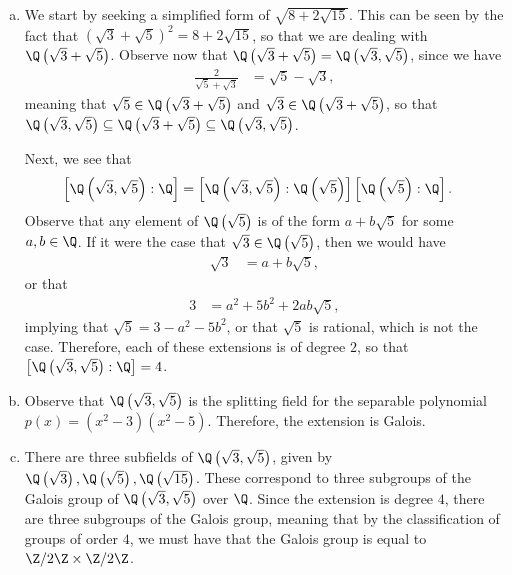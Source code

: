 \documentclass[10pt]{mypackage}
\begin{document}
\begin{solution}\hfill
  \begin{enumerate}[(a)]
    \item We start by seeking a simplified form of $\sqrt{8 + 2\sqrt{15}}$. This can be seen by the fact that $\left( \sqrt{3} + \sqrt{5} \right)^2 = 8 + 2\sqrt{15}$, so that we are dealing with $\Q\left( \sqrt{3} + \sqrt{5} \right)$. Observe now that $\Q\left( \sqrt{3} + \sqrt{5} \right) = \Q\left( \sqrt{3},\sqrt{5} \right)$, since we have
      \begin{align*}
        \frac{2}{\sqrt{5} + \sqrt{3}} &= \sqrt{5} - \sqrt{3},
      \end{align*}
      meaning that $\sqrt{5}\in \Q\left( \sqrt{3} + \sqrt{5}  \right)$ and $\sqrt{3}\in \Q\left( \sqrt{3} + \sqrt{5} \right)$, so that $\Q\left( \sqrt{3},\sqrt{5} \right)\subseteq \Q\left( \sqrt{3} + \sqrt{5} \right)\subseteq \Q\left( \sqrt{3},\sqrt{5} \right)$.

      Next, we see that
      \begin{align*}
        \left[ \Q\left( \sqrt{3},\sqrt{5} \right):\Q \right] &= \left[ \Q\left( \sqrt{3},\sqrt{5} \right):\Q\left( \sqrt{5} \right) \right] \left[ \Q\left( \sqrt{5} \right):\Q \right].
      \end{align*}
      Observe that any element of $\Q\left( \sqrt{5} \right)$ is of the form $a + b\sqrt{5}$ for some $a,b\in \Q$. If it were the case that $\sqrt{3}\in \Q\left( \sqrt{5} \right)$, then we would have
      \begin{align*}
        \sqrt{3} &= a + b\sqrt{5},
      \end{align*}
      or that
      \begin{align*}
        3 &= a^2 + 5b^2 + 2ab\sqrt{5},
      \end{align*}
      implying that $\sqrt{5} = 3 - a^2 - 5b^2$, or that $\sqrt{5}$ is rational, which is not the case. Therefore, each of these extensions is of degree $2$, so that $\left[ \Q\left( \sqrt{3},\sqrt{5} \right):\Q \right] = 4$.
    \item Observe that $\Q\left( \sqrt{3},\sqrt{5} \right)$ is the splitting field for the separable polynomial $p(x) = \left( x^2-3 \right)\left( x^2-5 \right)$. Therefore, the extension is Galois.
    \item There are three subfields of $\Q\left( \sqrt{3},\sqrt{5} \right)$, given by $\Q\left( \sqrt{3} \right),\Q\left( \sqrt{5} \right),\Q\left( \sqrt{15} \right)$. These correspond to three subgroups of the Galois group of $\Q\left( \sqrt{3},\sqrt{5} \right)$ over $\Q$. Since the extension is degree $4$, there are three subgroups of the Galois group, meaning that by the classification of groups of order $4$, we must have that the Galois group is equal to $\Z/2\Z\times\Z/2\Z$.
  \end{enumerate}
\end{solution}
\end{document}
